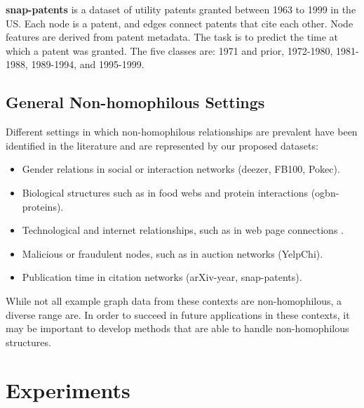 \documentclass[sigconf, balance=false]{acmart}
\newcommand{\myparagraph}[1]{\smallskip \noindent \textbf{#1}}
\begin{document}
\myparagraph{snap-patents} \cite{leskovec2005graphs, snapnets} is a dataset of utility patents granted between 1963 to 1999 in the US. Each node is a patent, and edges connect patents that cite each other. Node features are derived from patent metadata. The task is to predict the time at which a patent was granted. The five classes are:  1971 and prior, 1972-1980, 1981-1988, 1989-1994, and 1995-1999.

\subsection{General Non-homophilous Settings}

Different settings in which non-homophilous relationships are prevalent have been identified in the literature and are represented by our proposed datasets:
\begin{itemize}
    \item Gender relations in social or interaction networks  \cite{altenburger2018monophily, chin2019decoupled, jia2020residual} (deezer, FB100, Pokec).
    \item Biological structures such as in food webs \cite{gatterbauer2014semi} and protein interactions \cite{newman2003mixing} (ogbn-proteins).
    \item Technological and internet relationships, such as in web page connections \cite{newman2003mixing, pei2019geom}.
    \item Malicious or fraudulent nodes, such as in auction networks \cite{chau2006detecting, pandit2007netprobe} (YelpChi).
    \item Publication time in citation networks \cite{peel2017graph} (arXiv-year, snap-patents).
\end{itemize}
While not all example graph data from these contexts are non-homophilous, a diverse range are. In order to succeed in future applications in these contexts, it may be important to develop methods that are able to handle non-homophilous structures.



\section{Experiments}
\end{document}

